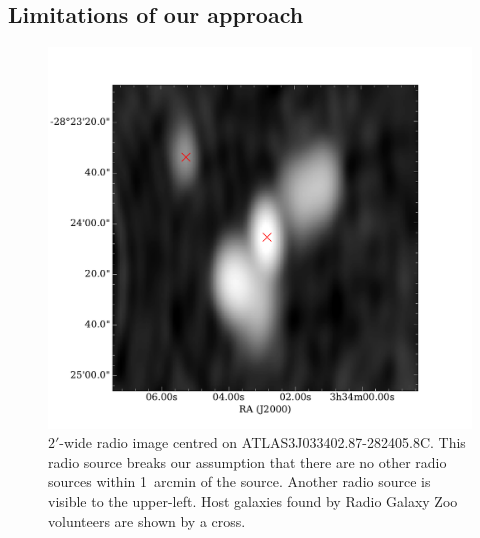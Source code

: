 \documentclass[fleqn,usenatbib,usedcolumn]{mnras}
\begin{document}
  \subsection{Limitations of our approach}
     \begin{figure}
      \centering
      \includegraphics[width=\linewidth]{images/ARG0003r2v_radio.pdf}
      \caption{$2'$-wide radio image centred on ATLAS3\textunderscore{}J033402.87-282405.8C.
        This radio source breaks our assumption that there are no other radio
        sources within 1~arcmin of the source. Another radio source is visible
        to the upper-left. Host galaxies found by Radio Galaxy Zoo volunteers
        are shown by a cross.}
      \label{fig:broken-isolation}
    \end{figure}
\end{document}

